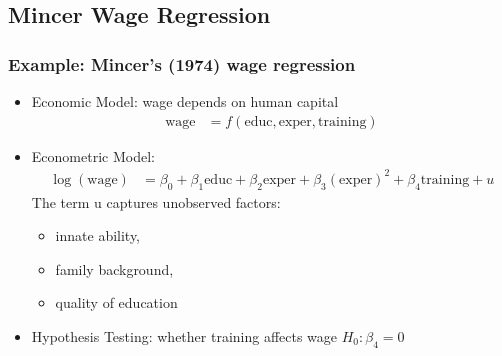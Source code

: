 

\subsection{Mincer Wage Regression}


\begin{frame}
  \frametitle{Example: Mincer's (1974) wage regression}
  \begin{itemize}
  \item Economic Model: wage depends on human capital
    \begin{align*}
    \mathrm{wage} &= f \left(\mathrm{educ}, \mathrm{exper},\mathrm{training}
    \right) 
     \end{align*}
  \item Econometric Model: 
    \begin{align*}
    \log(\mathrm{wage}) &= \beta_0 + \beta_1 \mathrm{educ} + \beta_2 \mathrm{exper}
    + \beta_3 (\mathrm{exper})^2 + \beta_4 \mathrm{training} +u 
     \end{align*}
    The term u captures unobserved factors:
    \begin{itemize}
    \item innate ability, 
    \item family background, 
    \item  quality of education
    \end{itemize}
  \item Hypothesis Testing: whether training affects wage $H_0 : \beta_4 = 0$
  \end{itemize}
\end{frame}
